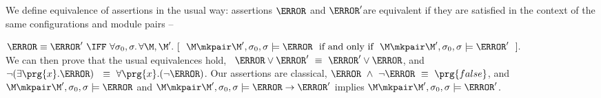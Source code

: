  
\label{sect:classical} 
We define equivalence of   assertions in the usual way: assertions $\A$ and $\A'$are equivalent if they are satisfied  in
the context of the same configurations and module pairs -- \ie\\
 \strut \hspace{1.1cm} $\A \equiv \A'\  \IFF\    \forall \sigma_0, \sigma.\, \forall \M, \M'. \ [\ \ \M\mkpair \M', \sigma_0,\sigma \models \A\ \mbox{ if and only if }\ \M\mkpair \M', \sigma_0,\sigma \models \A'\ \ ].$\\
We can then prove that the usual equivalences hold, \eg\  $ \A \vee \A' \ \equiv \  \A' \vee \A$, and\   $\neg (\exists \prg{x}.\A )  \  \ \equiv \  \forall \prg{x}.(\neg  \A)$.
%
Our assertions are classical, \eg  $ \A\ \wedge\ \neg \A \ \equiv \  \prg{false}$, and $\M\mkpair \M', \sigma_0 , \sigma  \models \A$ and  $\M\mkpair \M', \sigma_0 , \sigma  \models \A \rightarrow \A'$  implies
$\M\mkpair \M', \sigma_0 , \sigma  \models \A '$. 





